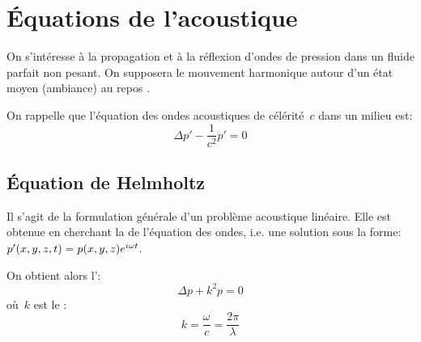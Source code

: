 \medskip
\section{Équations de l'acoustique}\label{Sec-EqFblAcou}
On s'intéresse à la propagation et à la réflexion d'ondes de pression dans un fluide parfait non pesant. On supposera le mouvement harmonique autour d'un état moyen (ambiance) au repos .

\medskip
On rappelle que l'équation des ondes acoustiques de célérité~$c$ dans un milieu est:
\begin{equation}
\Delta p' - \dfrac1{c^2} \ddot{p}' = 0
\end{equation}

\medskip
\subsection{Équation de Helmholtz}
Il s'agit de la formulation générale d'un problème acoustique linéaire. Elle est obtenue en cherchant la  de l'équation des ondes, i.e. une solution sous la forme:~$p'(x,y,z,t)=p(x,y,z)\mathrm \mathrm{e}^{i\omega t}$. 

On obtient alors l':
\begin{equation}\label{Eq-Helm} \Delta p + k^2 p=0 \end{equation}
où~$k$ est le :
\begin{equation}
k=\dfrac\omega{c}=\dfrac{2\pi}\lambda
\end{equation}

\medskip
